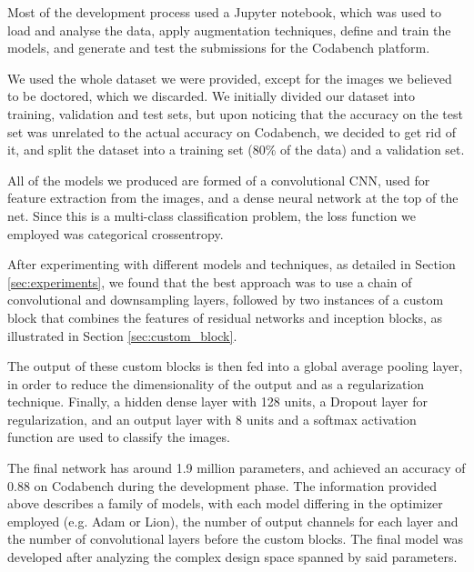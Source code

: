 \documentclass[11pt]{article}
\begin{document}
\begin{multicols}{2}


      Most of the development process used a Jupyter notebook, which was used to load and
      analyse the data, apply augmentation techniques, define and train the models, and
      generate and test the submissions for the Codabench platform.

      We used the whole dataset we were provided, except for the images we believed to be
      doctored, which we discarded. We initially divided our dataset into training, validation
      and test sets, but upon noticing that the accuracy on the test set was unrelated to the
      actual accuracy on Codabench, we decided to get rid of it, and split the dataset into a 
      training set (80\% of the data) and a validation set.

      All of the models we produced are formed of a convolutional CNN, used for feature extraction 
      from the images, and a dense neural network at the top of the net. Since this is a multi-class
      classification problem, the loss function we employed was categorical crossentropy.

      After experimenting with different models and techniques, as detailed in
      Section \ref{sec:experiments}, we found that the best approach was to 
      use a chain of convolutional and downsampling layers, followed by two instances
      of a custom block that combines the features of residual networks and inception 
      blocks, as illustrated in Section \ref{sec:custom_block}.

      The output of these custom blocks is then fed into a global average
      pooling layer, in order to reduce the dimensionality of the output and as a regularization technique. 
      Finally, a hidden dense layer with 128 units, a Dropout layer for regularization, and an output layer 
      with 8 units and a softmax activation function are used to classify the images.

      The final network has around 1.9 million parameters, and achieved an accuracy of 0.88 on Codabench
      during the development phase. The information provided above describes a family of models, with
      each model differing in the optimizer employed (e.g. Adam or Lion), the number of output channels
      for each layer and the number of convolutional layers before the custom blocks. The final model 
      was developed after analyzing the complex design space spanned by said parameters.


\end{multicols}
\end{document}
